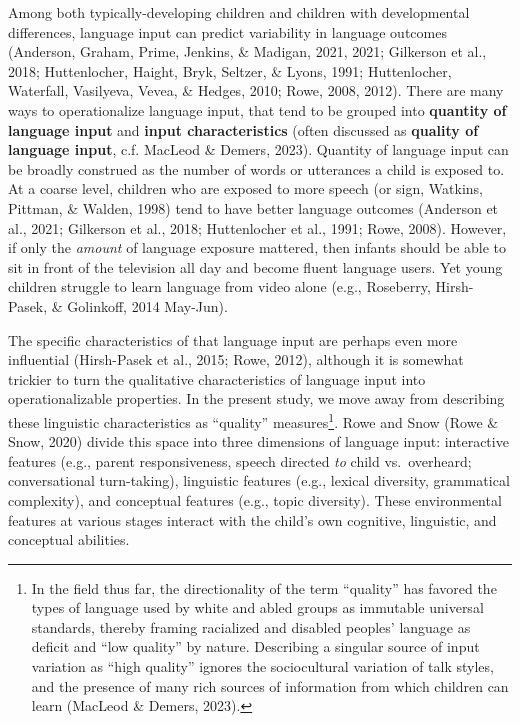 \documentclass[
  man,floatsintext]{apa6}
\begin{document}
Among both typically-developing children and children with developmental differences, language input can predict variability in language outcomes (Anderson, Graham, Prime, Jenkins, \& Madigan, 2021, 2021; Gilkerson et al., 2018; Huttenlocher, Haight, Bryk, Seltzer, \& Lyons, 1991; Huttenlocher, Waterfall, Vasilyeva, Vevea, \& Hedges, 2010; Rowe, 2008, 2012). There are many ways to operationalize language input, that tend to be grouped into \textbf{quantity of language input} and \textbf{input characteristics} (often discussed as \textbf{quality of language input}, c.f. MacLeod \& Demers, 2023). Quantity of language input can be broadly construed as the number of words or utterances a child is exposed to. At a coarse level, children who are exposed to more speech (or sign, Watkins, Pittman, \& Walden, 1998) tend to have better language outcomes (Anderson et al., 2021; Gilkerson et al., 2018; Huttenlocher et al., 1991; Rowe, 2008). However, if only the \emph{amount} of language exposure mattered, then infants should be able to sit in front of the television all day and become fluent language users. Yet young children struggle to learn language from video alone (e.g., Roseberry, Hirsh-Pasek, \& Golinkoff, 2014 May-Jun).

The specific characteristics of that language input are perhaps even more influential (Hirsh-Pasek et al., 2015; Rowe, 2012), although it is somewhat trickier to turn the qualitative characteristics of language input into operationalizable properties. In the present study, we move away from describing these linguistic characteristics as ``quality'' measures\footnote{In the field thus far, the directionality of the term ``quality'' has favored the types of language used by white and abled groups as immutable universal standards, thereby framing racialized and disabled peoples' language as deficit and ``low quality'' by nature. Describing a singular source of input variation as ``high quality'' ignores the sociocultural variation of talk styles, and the presence of many rich sources of information from which children can learn (MacLeod \& Demers, 2023).}. Rowe and Snow (Rowe \& Snow, 2020) divide this space into three dimensions of language input: interactive features (e.g., parent responsiveness, speech directed \emph{to} child vs.~overheard; conversational turn-taking), linguistic features (e.g., lexical diversity, grammatical complexity), and conceptual features (e.g., topic diversity). These environmental features at various stages interact with the child's own cognitive, linguistic, and conceptual abilities.
\end{document}
